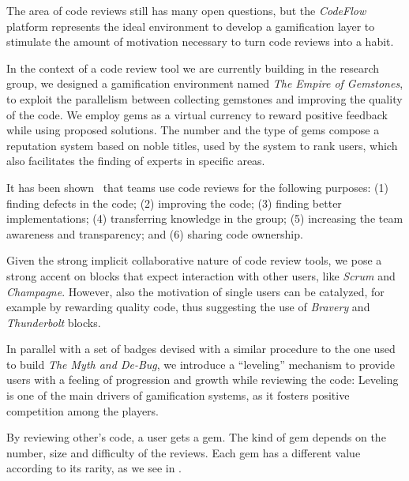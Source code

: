 The area of code reviews still has many open questions, but the \textit{CodeFlow} platform represents the ideal environment to develop a gamification layer to stimulate the amount of motivation necessary to turn code reviews into a habit.

In the context of a code review tool we are currently building in the research group, we designed a gamification environment named \textit{The Empire of Gemstones}, to exploit the parallelism between collecting gemstones and improving the quality of the code.
We employ gems as a virtual currency to reward positive feedback while using proposed solutions.
The number and the type of gems compose a reputation system based on noble titles, used by the system to rank users, which also facilitates the finding of experts in specific areas.

It has been shown~\cite{Bacc2013a} that teams use code reviews for the following purposes: (1) finding defects in the code; (2) improving the code; (3) finding better implementations; (4) transferring knowledge in the group; (5) increasing the team awareness and transparency; and (6) sharing code ownership.

Given the strong implicit collaborative nature of code review tools, we pose a strong accent on blocks that expect interaction with other users, like \emph{Scrum} and \emph{Champagne}.
However, also the motivation of single users can be catalyzed, for example by rewarding quality code, thus suggesting the use of \emph{Bravery} and \emph{Thunderbolt} blocks.

In parallel with a set of badges devised with a similar procedure to the one used to build \textit{The Myth and De-Bug}, we introduce a ``leveling'' mechanism to provide users with a feeling of progression and growth while reviewing the code: Leveling is one of the main drivers of gamification systems, as it fosters positive competition among the players.

By reviewing other's code, a user gets a gem.
The kind of gem depends on the number, size and difficulty of the reviews.
Each gem has a different value according to its rarity, as we see in .


